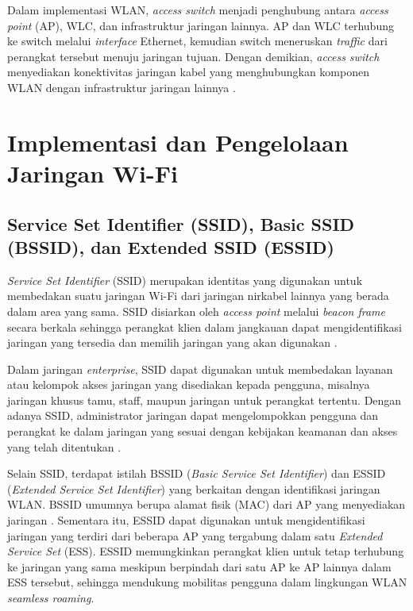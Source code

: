 Dalam implementasi WLAN, \textit{access switch} menjadi penghubung antara \textit{access point} (AP), WLC, dan infrastruktur jaringan lainnya. AP dan WLC terhubung ke switch melalui \textit{interface} Ethernet, kemudian switch meneruskan \textit{traffic} dari perangkat tersebut menuju jaringan tujuan. Dengan demikian, \textit{access switch} menyediakan konektivitas jaringan kabel yang menghubungkan komponen WLAN dengan infrastruktur jaringan lainnya \parencite{RUIJIE_ACCESS_SWITCH_2023}.

\section{Implementasi dan Pengelolaan Jaringan Wi-Fi}

\subsection{Service Set Identifier (SSID), Basic SSID (BSSID), dan Extended SSID (ESSID)}

\textit{Service Set Identifier} (SSID) merupakan identitas yang digunakan untuk membedakan suatu jaringan Wi-Fi dari jaringan nirkabel lainnya yang berada dalam area yang sama. SSID disiarkan oleh \textit{access point} melalui \textit{beacon frame} secara berkala sehingga perangkat klien dalam jangkauan dapat mengidentifikasi jaringan yang tersedia dan memilih jaringan yang akan digunakan \parencite{FORTINET_SSID}.

Dalam jaringan \textit{enterprise}, SSID dapat digunakan untuk membedakan layanan atau kelompok akses jaringan yang disediakan kepada pengguna, misalnya jaringan khusus tamu, staff, maupun jaringan untuk perangkat tertentu. Dengan adanya SSID, administrator jaringan dapat mengelompokkan pengguna dan perangkat ke dalam jaringan yang sesuai dengan kebijakan keamanan dan akses yang telah ditentukan \parencite{FORTINET_SSID}.

Selain SSID, terdapat istilah BSSID (\textit{Basic Service Set Identifier}) dan ESSID (\textit{Extended Service Set Identifier}) yang berkaitan dengan identifikasi jaringan WLAN. BSSID umumnya berupa alamat fisik (MAC) dari AP yang menyediakan jaringan \parencite{FORTINET_SSID}. Sementara itu, ESSID dapat digunakan untuk mengidentifikasi jaringan yang terdiri dari beberapa AP yang tergabung dalam satu \textit{Extended Service Set} (ESS). ESSID memungkinkan perangkat klien untuk tetap terhubung ke jaringan yang sama meskipun berpindah dari satu AP ke AP lainnya dalam ESS tersebut, sehingga mendukung mobilitas pengguna dalam lingkungan WLAN \textit{seamless roaming}.

